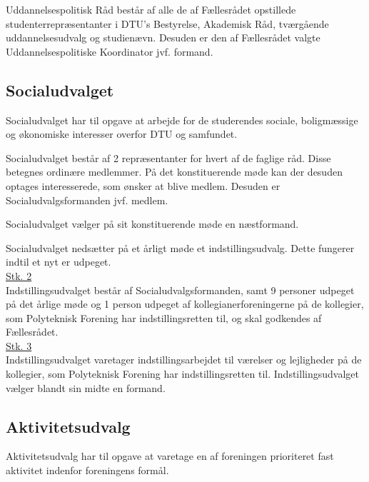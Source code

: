 \begin{list}
\item Uddannelsespolitisk Råd består af alle de af Fællesrådet opstillede studenterrepræsentanter i DTU’s Bestyrelse, Akademisk Råd, tværgående uddannelsesudvalg og studienævn. Desuden er den af Fællesrådet valgte Uddannelsespolitiske Koordinator jvf.  formand.\\

\subsection{Socialudvalget}
\label{L:kap:socialudvalg}
\item Socialudvalget har til opgave at arbejde for de studerendes sociale, boligmæssige og økonomiske interesser overfor DTU og samfundet.\\

\item Socialudvalget består af 2 repræsentanter for hvert af de faglige råd. Disse betegnes ordinære medlemmer. På det konstituerende møde kan der desuden optages interesserede, som ønsker at blive medlem. Desuden er Socialudvalgsformanden jvf.  medlem.\\

\item Socialudvalget vælger på sit konstituerende møde en næstformand.\\

\item Socialudvalget nedsætter på et årligt møde et indstillingsudvalg. Dette fungerer indtil et nyt er udpeget.\\

\underline{Stk. 2} \\
Indstillingsudvalget består af Socialudvalgsformanden, samt 9 personer udpeget på det årlige møde og 1 person udpeget af kollegianerforeningerne på de kollegier, som Polyteknisk Forening har indstillingsretten til, og skal godkendes af Fællesrådet.\\

\underline{Stk. 3} \\
Indstillingsudvalget varetager indstillingsarbejdet til værelser og lejligheder på de kollegier, som Polyteknisk Forening har indstillingsretten til. Indstillingsudvalget vælger blandt sin midte en formand.



\subsection{Aktivitetsudvalg}
\label{L:kap:aktivitetsudvalg}
\item Aktivitetsudvalg har til opgave at varetage en af foreningen prioriteret fast aktivitet indenfor foreningens formål.


\end{list}
